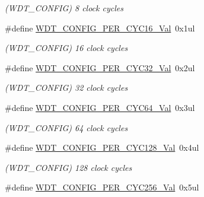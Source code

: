 \begin{DoxyCompactItemize}
\begin{DoxyCompactList}\small\item\em (W\+D\+T\+\_\+\+C\+O\+N\+F\+I\+G) 8 clock cycles \end{DoxyCompactList}\item 
\hypertarget{group___s_a_m_l21___w_d_t_gafba76efe714284a6759149005d42e068}{}\#define \hyperlink{group___s_a_m_l21___w_d_t_gafba76efe714284a6759149005d42e068}{W\+D\+T\+\_\+\+C\+O\+N\+F\+I\+G\+\_\+\+P\+E\+R\+\_\+\+C\+Y\+C16\+\_\+\+Val}~0x1ul\label{group___s_a_m_l21___w_d_t_gafba76efe714284a6759149005d42e068}

\begin{DoxyCompactList}\small\item\em (W\+D\+T\+\_\+\+C\+O\+N\+F\+I\+G) 16 clock cycles \end{DoxyCompactList}\item 
\hypertarget{group___s_a_m_l21___w_d_t_gae718e0cf52132982208c6081d329f114}{}\#define \hyperlink{group___s_a_m_l21___w_d_t_gae718e0cf52132982208c6081d329f114}{W\+D\+T\+\_\+\+C\+O\+N\+F\+I\+G\+\_\+\+P\+E\+R\+\_\+\+C\+Y\+C32\+\_\+\+Val}~0x2ul\label{group___s_a_m_l21___w_d_t_gae718e0cf52132982208c6081d329f114}

\begin{DoxyCompactList}\small\item\em (W\+D\+T\+\_\+\+C\+O\+N\+F\+I\+G) 32 clock cycles \end{DoxyCompactList}\item 
\hypertarget{group___s_a_m_l21___w_d_t_gaed410571015c1d792431f3c6e3503222}{}\#define \hyperlink{group___s_a_m_l21___w_d_t_gaed410571015c1d792431f3c6e3503222}{W\+D\+T\+\_\+\+C\+O\+N\+F\+I\+G\+\_\+\+P\+E\+R\+\_\+\+C\+Y\+C64\+\_\+\+Val}~0x3ul\label{group___s_a_m_l21___w_d_t_gaed410571015c1d792431f3c6e3503222}

\begin{DoxyCompactList}\small\item\em (W\+D\+T\+\_\+\+C\+O\+N\+F\+I\+G) 64 clock cycles \end{DoxyCompactList}\item 
\hypertarget{group___s_a_m_l21___w_d_t_gaccbab206b332dddc6fa1a01729fc092f}{}\#define \hyperlink{group___s_a_m_l21___w_d_t_gaccbab206b332dddc6fa1a01729fc092f}{W\+D\+T\+\_\+\+C\+O\+N\+F\+I\+G\+\_\+\+P\+E\+R\+\_\+\+C\+Y\+C128\+\_\+\+Val}~0x4ul\label{group___s_a_m_l21___w_d_t_gaccbab206b332dddc6fa1a01729fc092f}

\begin{DoxyCompactList}\small\item\em (W\+D\+T\+\_\+\+C\+O\+N\+F\+I\+G) 128 clock cycles \end{DoxyCompactList}\item 
\hypertarget{group___s_a_m_l21___w_d_t_ga97dab16547481df7f3c7a0c8b1ab5797}{}\#define \hyperlink{group___s_a_m_l21___w_d_t_ga97dab16547481df7f3c7a0c8b1ab5797}{W\+D\+T\+\_\+\+C\+O\+N\+F\+I\+G\+\_\+\+P\+E\+R\+\_\+\+C\+Y\+C256\+\_\+\+Val}~0x5ul\label{group___s_a_m_l21___w_d_t_ga97dab16547481df7f3c7a0c8b1ab5797}


\end{DoxyCompactItemize}
